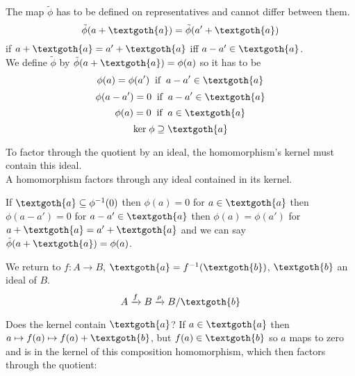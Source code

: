 \documentclass{article}
\begin{document}

\noindent
The map $\tilde{\phi}$ has to be defined on representatives and cannot differ between them.
\[
  \tilde{\phi}(a + \textgoth{a}) = \tilde{\phi}(a' + \textgoth{a})
\]
if $a + \textgoth{a} = a' + \textgoth{a}$ iff $a - a' \in \textgoth{a}$. \\
We define $\tilde{\phi}$ by $\tilde{\phi}(a + \textgoth{a}) = \phi(a)$ so it has to be
\[
  \phi(a) = \phi(a') \;\; \text{if} \;\; a - a' \in \textgoth{a} 
\]
\[
  \phi(a - a') = 0 \;\; \text{if} \;\; a - a' \in \textgoth{a}
\]
\[
  \phi(a) = 0 \;\; \text{if} \;\; a \in \textgoth{a}
\]
\[
  \textrm{ker} \; \phi \supseteq \textgoth{a}
\]

\noindent
To factor through the quotient by an ideal, the homomorphism's kernel must contain this ideal. \\
A homomorphism factors through any ideal contained in its kernel.

If $\textgoth{a} \subseteq \phi^{-1}(0)$ then $\phi(a) = 0$ for $a \in \textgoth{a}$ then $\phi(a - a') = 0$ for $a - a' \in \textgoth{a}$ then $\phi(a) = \phi(a')$ for $a + \textgoth{a} = a' + \textgoth{a}$ and we can say $\tilde{\phi}(a + \textgoth{a}) = \phi(a)$.

We return to $f: A \rightarrow B$, $\textgoth{a} = f^{-1}(\textgoth{b})$, $\textgoth{b}$ an ideal of $B$.
\[
  A \xrightarrow{f} B \xrightarrow{\rho} B/\textgoth{b}
\]

\noindent

Does the kernel contain $\textgoth{a}$? If $a \in \textgoth{a}$ then $a \mapsto f(a) \mapsto f(a) + \textgoth{b}$, but $f(a) \in \textgoth{b}$ so $a$ maps to zero and is in the kernel of this composition homomorphism, which then factors through the quotient:


\end{document}
